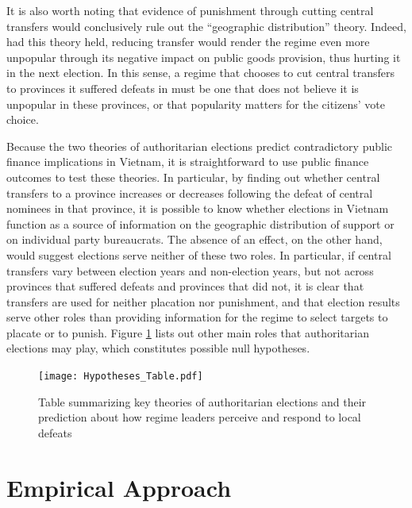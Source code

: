 \documentclass[12pt]{article}\usepackage[]{graphicx}\usepackage[]{color}
\newcommand{\1}{\mathbbm{1}}
\begin{document}
It is also worth noting that evidence of punishment through cutting central transfers would conclusively rule out the ``geographic distribution'' theory. Indeed, had this theory held, reducing transfer would render the regime even more unpopular through its negative impact on public goods provision, thus hurting it in the next election. In this sense, a regime that chooses to cut central transfers to provinces it suffered defeats in must be one that does not believe it is unpopular in these provinces, or that popularity matters for the citizens' vote choice.


Because the two theories of authoritarian elections predict contradictory public finance implications in Vietnam, it is straightforward to use public finance outcomes to test these theories. In particular, by finding out whether central transfers to a province increases or decreases following the defeat of central nominees in that province, it is possible to know whether elections in Vietnam function as a source of information on the geographic distribution of support or on individual party bureaucrats. The absence of an effect, on the other hand, would suggest elections serve neither of these two roles. In particular, if central transfers vary between election years and non-election years, but not across provinces that suffered defeats and provinces that did not, it is clear that transfers are used for neither placation nor punishment, and that election results serve other roles than providing information for the regime to select targets to placate or to punish. Figure \ref{fig:Theory} lists out other main roles that authoritarian elections may play, which constitutes possible null hypotheses. 

\begin{landscape}
	\begin{figure}[h]
		\begin{centering}
				\texttt{[image: Hypotheses\_Table.pdf]}
		\end{centering}
		\caption{Table summarizing key theories of authoritarian elections and their prediction about how regime leaders perceive and respond to local defeats}
		\label{fig:Theory}
	\end{figure}
\end{landscape}

\section{Empirical Approach}
\label{sec:methods}
\end{document}
